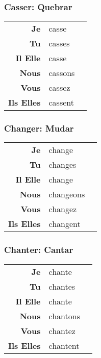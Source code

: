\documentclass{subfiles}
\begin{document}
\begin{multicols*}{3}
        \subsubsection{Casser: Quebrar}
            \begin{tabular}{r l r}
                \textbf{Je}        & casse   &\\
                \textbf{Tu}        & casses  &\\
                \textbf{Il Elle}   & casse   &\\
                \textbf{Nous}      & cassons &\\
                \textbf{Vous}      & cassez  &\\
                \textbf{Ils Elles} & cassent &
            \end{tabular}

        \subsubsection{Changer: Mudar}
            \begin{tabular}{r l r}
                \textbf{Je}        & change    &\\
                \textbf{Tu}        & changes   &\\
                \textbf{Il Elle}   & change    &\\
                \textbf{Nous}      & changeons &\\
                \textbf{Vous}      & changez   &\\
                \textbf{Ils Elles} & changent  &
            \end{tabular}
        
        \subsubsection{Chanter: Cantar}
            \begin{tabular}{r l r}
                \textbf{Je}        & chante   &\\
                \textbf{Tu}        & chantes  &\\
                \textbf{Il Elle}   & chante   &\\
                \textbf{Nous}      & chantons &\\
                \textbf{Vous}      & chantez  &\\
                \textbf{Ils Elles} & chantent &
            \end{tabular}


\end{multicols*}
\end{document}
